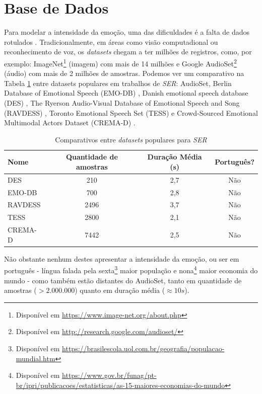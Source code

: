 \section{Base de Dados}\label{section:basesdedados}

Para modelar a intensidade da emoção, uma das dificuldades é a falta de dados rotulados \cite{18}. Tradicionalmente, em áreas como visão computadional ou reconhecimento de voz, os \textit{datasets} chegam a ter milhões de registros, como, por exemplo: ImageNet\footnote{Disponível em \url{https://www.image-net.org/about.php}} (imagem) com  mais de 14 milhões e Google AudioSet\footnote{Disponível em \url{http://research.google.com/audioset/}} (áudio) com mais de 2 milhões de amostras. Podemos ver um comparativo na Tabela \ref{table:comparativodbs} entre datasets populares \cite{32} em trabalhos de \textit{SER}: AudioSet, Berlin Database of Emotional Speech (EMO-DB) \cite{32.55}, Danish emotional speech database (DES) \cite{32.56}, The Ryerson Audio-Visual Database of Emotional Speech and Song (RAVDESS) \cite{32.57}, Toronto Emotional Speech Set (TESS) \cite{32.58} e Crowd-Sourced Emotional Multimodal Actors Dataset (CREMA-D) \cite{32.59}.

\begin{table}[!ht]
\centering
\caption{Comparativos entre \textit{datasets} populares para \textit{SER}}
    \begin{tabular}{|l|c|c|c|}
    \hline
        Nome & Quantidade de amostras & Duração Média (s) & Português?  \\ \hline
        DES  & 210 & 2,7 & Não  \\ \hline
        EMO-DB  & 700 & 2,8 & Não  \\ \hline
        RAVDESS  & 2496 & 3,7 & Não  \\ \hline
        TESS  & 2800 & 2,1 & Não  \\ \hline
        CREMA-D  & 7442 & 2,5 & Não  \\ \hline
    \end{tabular}\label{table:comparativodbs}
\end{table}

Não obstante nenhum destes apresentar a intensidade da emoção, ou ser em português - língua falada pela sexta\footnote{Disponível em \url{https://brasilescola.uol.com.br/geografia/populacao-mundial.htm}} maior população e nona\footnote{Disponível em \url{https://www.gov.br/funag/pt-br/ipri/publicacoes/estatisticas/as-15-maiores-economias-do-mundo}} maior economia do mundo - como também estão distantes do AudioSet, tanto em quantidade de amostras ($> 2.000.000$) quanto em duração média ($\approx 10s$).

